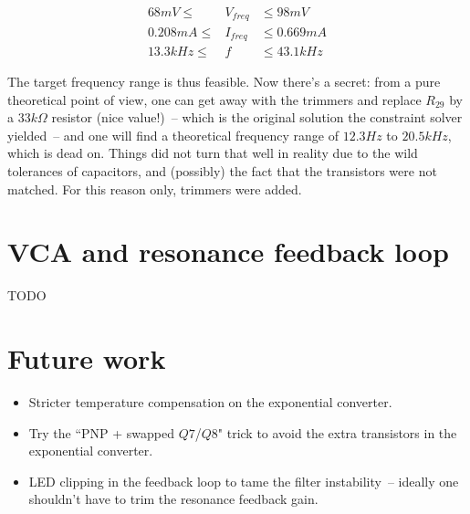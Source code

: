 \documentclass[a4paper,11pt]{article}
\begin{document}
\begin{eqnarray}
68mV \leq &V_{freq}& \leq 98mV \\
0.208 mA \leq &I_{freq}& \leq 0.669 mA \\
13.3kHz \leq &f& \leq 43.1kHz
\end{eqnarray}

The target frequency range is thus feasible. Now there's a secret: from a pure theoretical point of view, one can get away with the trimmers and replace $R_{29}$ by a $33k\Omega$ resistor (nice value!)~-- which is the original solution the constraint solver yielded~-- and one will find a theoretical frequency range of $12.3 Hz$ to $20.5kHz$, which is dead on. Things did not turn that well in reality due to the wild tolerances of capacitors, and (possibly) the fact that the transistors were not matched. For this reason only, trimmers were added.

\section{VCA and resonance feedback loop}
\label{sec:vca}

TODO

\section{Future work}

\begin{itemize}
\item Stricter temperature compensation on the exponential converter.
\item Try the ``PNP + swapped $Q7$/$Q8$" trick to avoid the extra transistors in the exponential converter.
\item LED clipping in the feedback loop to tame the filter instability~-- ideally one shouldn't have to trim the resonance feedback gain.
\end{itemize}
\end{document}

